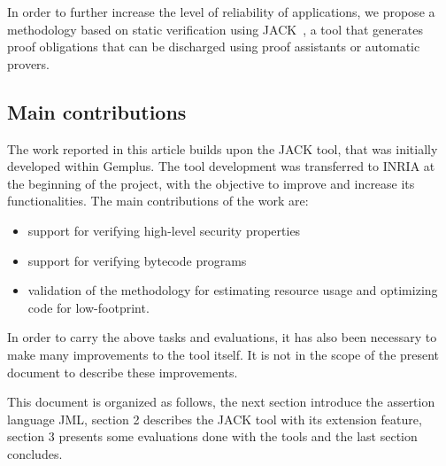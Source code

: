 In order to further increase the level of reliability of applications,
we propose a methodology based on static verification using
JACK~\cite{BRL-JACK}, a tool that generates proof obligations that
can be discharged using proof assistants or automatic provers.


\subsection{Main contributions}
The work reported in this article builds upon the JACK tool,
that was initially developed within Gemplus. The tool development
was transferred to INRIA at the beginning of the project, with
the objective to improve and increase its functionalities. The main contributions of the
work are:
\begin{itemize}
\item support for verifying high-level security properties
\item support for verifying bytecode programs
\item validation of the methodology for estimating resource
usage and optimizing code for low-footprint.
\end{itemize}
In order to carry the above tasks and evaluations, it has also
been necessary to make many improvements to the tool itself.
It is not in the scope of the present document to describe these 
improvements.


This document is organized as follows, the next section introduce the
assertion language JML, section 2 describes the JACK tool with its
extension feature, section 3 presents some evaluations done with the
tools and the last section concludes.
